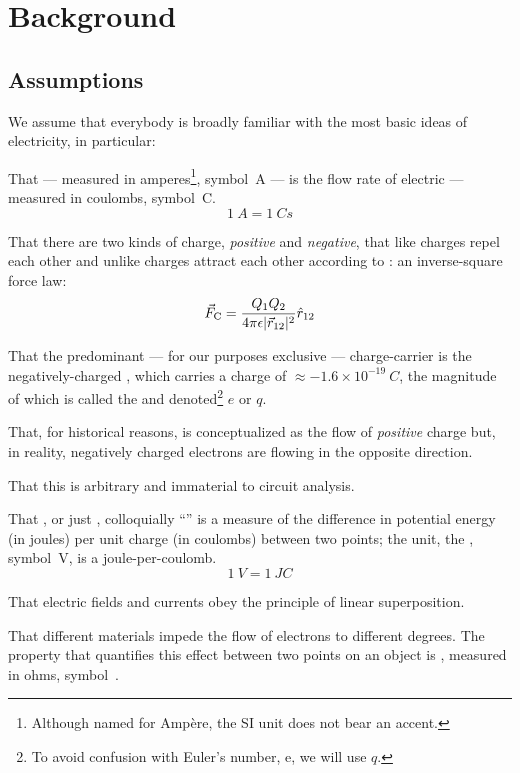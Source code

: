 \section{Background}

\subsection{Assumptions}
We assume that everybody is broadly familiar with the most basic ideas
of electricity, in particular:

That  --- measured in amperes\footnote{Although named
  for Amp\`ere, the SI unit does not bear an accent.}, symbol~\unit{A}
--- is the flow rate of electric  --- measured in
coulombs, symbol~\unit{C}.
\[
1~\unit{A} = 1~\unit{C}{s}
\]

That there are two kinds of charge, \emph{positive} and
\emph{negative}, that like charges repel each other and unlike charges
attract each other according to : an
inverse-square force law:
\[
\vec{F}_\mathrm{C} = \frac{Q_1 Q_2}{4\pi\epsilon\lvert\vec{r}_{12}\rvert^2}\hat{r}_{12}
\]

That the predominant --- for our purposes exclusive --- charge-carrier
is the negatively-charged , which carries a charge of
$\approx-1.6\times 10^{-19}~\unit{C}$, the magnitude of which is called the
 and denoted\footnote{To avoid confusion with
  Euler's number, $\mathrm{e}$, we will use $q$.} $e$ or $q$.

That, for historical reasons,  is
conceptualized as the flow of \emph{positive} charge but, in reality,
negatively charged electrons are flowing in the opposite direction.

That this is arbitrary and immaterial to circuit analysis.

That , or just , colloquially ``'' is a measure of the
difference in potential energy (in joules) per unit charge (in
coulombs) between two points; the unit, the ,
symbol~\unit{V}, is a joule-per-coulomb.
\[
1~\unit{V} = 1~\unit{J}{C}
\]

That electric fields and currents obey the principle of linear
superposition.

That different materials impede the flow of electrons to different
degrees. The property that quantifies this effect between two points
on an object is , measured in ohms, symbol~\unit{\Omega}.

